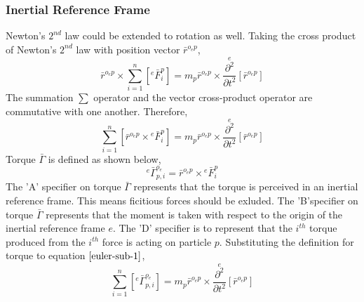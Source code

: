 \documentclass[a4paper, 12pt]{report}
\begin{document}
\begin{center}
\subsubsection{Inertial Reference Frame}
\begin{comment}
\end{comment}
Newton's $2^{nd}$ law could be extended to rotation as well. Taking the cross product of Newton's $2^{nd}$ law with position vector $\bar{r}^{o_{e}p}$,
$$\bar{r}^{o_{e}p}\times\sum^{n}_{i = 1}\left[{}^{e}\bar{F}^{p}_{i}\right] = m_{p}\bar{r}^{o_{e}p}\times\overset{e}{\frac{\partial^{2}}{\partial t^{2}}}[\bar{r}^{o_{e}p}]$$
The summation $\displaystyle\sum$ operator and the vector cross-product operator are commutative with one another. Therefore,
\begin{equation}\sum^{n}_{i = 1}\left[\bar{r}^{o_{e}p}\times{}^{e}\bar{F}^{p}_{i}\right] = m_{p}\bar{r}^{o_{e}p}\times\overset{e}{\frac{\partial^{2}}{\partial t^{2}}}[\bar{r}^{o_{e}p}]\label{euler-sub-1}\end{equation}
Torque $\bar{\Gamma}$ is defined as shown below,
\begin{equation}{}^{e}\bar{\Gamma}^{o_{e}}_{p,i} = \bar{r}^{o_{e}p}\times{}^{e}\bar{F}^{p}_{i}\label{torque-definition}\end{equation}
The 'A' specifier on torque $\bar{\Gamma}$ represents that the torque is perceived in an inertial reference frame. This means ficitious forces should be exluded. The 'B'specifier on torque $\bar{\Gamma}$ represents that the moment is taken with respect to the origin of the inertial reference frame $e$. The 'D' specifier is to represent that the $i^{th}$ torque produced from the $i^{th}$ force is acting on particle $p$. Substituting the definition for torque to equation $\ref{euler-sub-1}$,
\begin{equation}\sum^{n}_{i = 1}\left[{}^{e}\bar{\Gamma}^{o_{e}}_{p,i}\right] = m_{p}\bar{r}^{o_{e}p}\times\overset{e}{\frac{\partial^{2}}{\partial t^{2}}}[\bar{r}^{o_{e}p}]\label{euler-sub-2}\end{equation}


\end{center}
\end{document}
